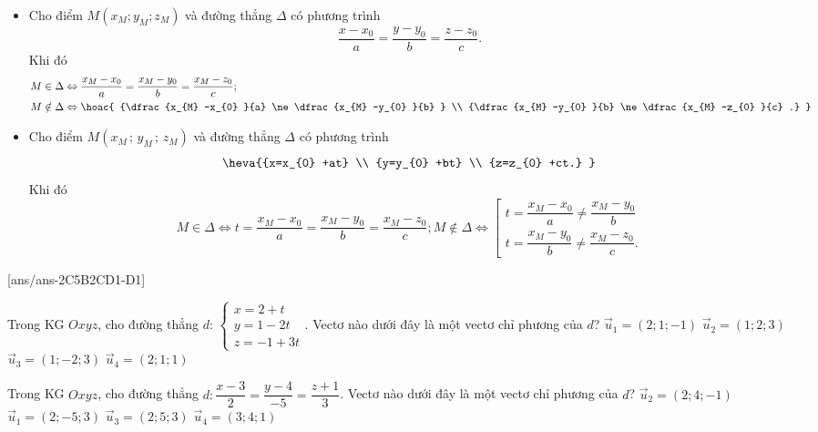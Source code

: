 \begin{itemize}
	\item  Cho điểm $M\left(x_{M} ; y_{M} ; z_{M} \right)$ và đường thẳng $\Delta $ có phương trình $$\dfrac{x-x_{0} }{a} =\dfrac{y-y_{0} }{b} =\dfrac{z-z_{0} }{c} .$$ Khi đó
	\begin{align*}
	M\in \Delta & \Leftrightarrow \dfrac{x_{M} -x_{0} }{a} =\dfrac{x_{M} -y_{0} }{b} =\dfrac{x_{M} -z_{0} }{c} ;\\
	 M\notin \Delta &\Leftrightarrow \hoac{ {\dfrac{x_{M} -x_{0} }{a} \ne \dfrac{x_{M} -y_{0} }{b} } \\ {\dfrac{x_{M} -y_{0} }{b} \ne \dfrac{x_{M} -z_{0} }{c} .} }
	\end{align*}
	\item  Cho điểm $M\left(x_{M} \, ;\, y_{M} \, ;\, z_{M} \right)$ và đường thẳng $\Delta $ có phương trình $$\heva{{x=x_{0} +at} \\ {y=y_{0} +bt} \\ {z=z_{0} +ct.} } $$ 
	Khi đó
\[M\in \Delta \Leftrightarrow t=\dfrac{x_{M} -x_{0} }{a} =\dfrac{x_{M} -y_{0} }{b} =\dfrac{x_{M} -z_{0} }{c} ;      M\notin \Delta \Leftrightarrow \left[\begin{array}{l} {t=\dfrac{x_{M} -x_{0} }{a} \ne \dfrac{x_{M} -y_{0} }{b} } \\ {t=\dfrac{x_{M} -y_{0} }{b} \ne \dfrac{x_{M} -z_{0} }{c} .} \end{array}\right. \]
\end{itemize}
\TN
{}[ans/ans-2C5B2CD1-D1]
\begin{ex}%
	Trong KG $Oxyz$, cho đường thẳng $d$: $\left\{\begin{array}{c} {x=2+t} \\ {y=1-2t} \\ {z=-1+3t} \end{array}\right.$. Vectơ nào dưới đây là một vectơ chỉ phương của $d$?
	\choice
		{$\overrightarrow{u}_1=(2;1;-1)$}
		{$\overrightarrow{u}_2=(1;2;3)$}
		{\True $\overrightarrow{u}_3=(1;-2;3)$}
		{$\overrightarrow{u}_4=(2;1;1)$}
\end{ex}

\begin{ex}%
	Trong KG $Oxyz$, cho đường thẳng $d:\dfrac{x-3}{2}=\dfrac{y-4}{-5}=\dfrac{z+1}{3}$. Vectơ nào dưới đây là một vectơ chỉ phương của $d$?
	\choice
		{$\overrightarrow{u}_2=\left(2;4;-1\right)$}
		{\True $\overrightarrow{u}_1=\left(2;-5;3\right)$}
		{$\overrightarrow{u}_3=\left(2;5;3\right)$}
		{$\overrightarrow{u}_4=\left(3;4;1\right)$}
\end{ex}

